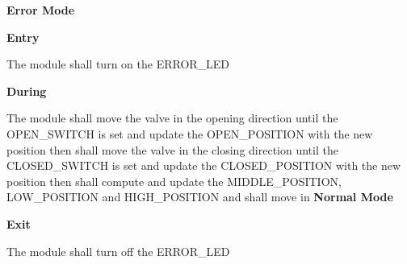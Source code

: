 \begin{req_enum}
\begin{req_enum}[label*=\arabic*.]
					\item \textbf{Error Mode}
						\begin{req_enum}[label*=\arabic*.]
							\item \textbf{Entry}
								\begin{req_enum}[label*=\arabic*.]
									\item The module shall turn on the ERROR\_LED
								\end{req_enum}
							\item \textbf{During}
								\begin{req_enum}[label*=\arabic*.]
									\item The module shall move the valve in the opening direction until the OPEN\_SWITCH is set and update the OPEN\_POSITION with the new position then shall move the valve in the closing direction until the CLOSED\_SWITCH is set and update the CLOSED\_POSITION with the new position then shall compute and update the MIDDLE\_POSITION, LOW\_POSITION and HIGH\_POSITION and shall move in \textbf{Normal Mode}
								\end{req_enum}

							\item \textbf{Exit}
								\begin{req_enum}[label*=\arabic*.]
									\item The module shall turn off the ERROR\_LED
								\end{req_enum}

						\end{req_enum}
				\end{req_enum}
		\end{req_enum}

